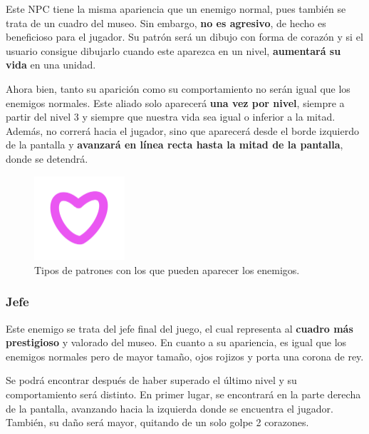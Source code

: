 Este NPC tiene la misma apariencia que un enemigo normal, pues también se trata de un cuadro del museo. Sin embargo, \textbf{no es agresivo}, de hecho es beneficioso para el jugador. Su patrón será un dibujo con forma de corazón y si el usuario consigue dibujarlo cuando este aparezca en un nivel, \textbf{aumentará su vida} en una unidad.

\vspace{0.5cm}

Ahora bien, tanto su aparición como su comportamiento no serán igual que los enemigos normales. Este aliado solo aparecerá \textbf{una vez por nivel}, siempre a partir del nivel 3 y siempre que nuestra vida sea igual o inferior a la mitad. Además, no correrá hacia el jugador, sino que aparecerá desde el borde izquierdo de la pantalla y \textbf{avanzará en línea recta hasta la mitad de la pantalla}, donde se detendrá.

\vspace{0.5cm}

\begin{figure}[htbp]
\centering
  \includegraphics[width=0.3\textwidth]{archivos/heart.png}
  \caption{Tipos de patrones con los que pueden aparecer los enemigos.}
  \label{fig:patterns_heart}
\end{figure}

\vspace{0.5cm}

\subsubsection{Jefe}

Este enemigo se trata del jefe final del juego, el cual representa al \textbf{cuadro más prestigioso} y valorado del museo. En cuanto a su apariencia, es igual que los enemigos normales pero de mayor tamaño, ojos rojizos y porta una corona de rey.

\vspace{0.5cm}

Se podrá encontrar después de haber superado el último nivel y su comportamiento será distinto. En primer lugar, se encontrará en la parte derecha de la pantalla, avanzando hacia la izquierda donde se encuentra el jugador. También, su daño será mayor, quitando de un solo golpe 2 corazones. 

